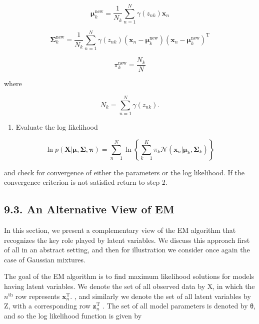 \documentclass[
  10
]{article}
\providecommand{\tightlist}{%
  \setlength{\itemsep}{0pt}\setlength{\parskip}{0pt}}
\begin{document}
\[
{\pmb {\mu} _ {k} ^ {\mathrm{new}}} = {\frac {1}{N _ {k}} \sum_ {n = 1} ^ {N} \gamma (z _ {n k}) \mathbf {x} _ {n}}\tag{9.24}
\]

\[
{\pmb {\Sigma} _ {k} ^ {\mathrm{new}}} = {\frac {1}{N _ {k}} \sum_ {n = 1} ^ {N} \gamma (z _ {n k}) (\mathbf {x} _ {n} - \pmb {\mu} _ {k} ^ {\mathrm{new}}) (\mathbf {x} _ {n} - \pmb {\mu} _ {k} ^ {\mathrm{new}}) ^ {\mathrm{T}}}\tag{9.25}
\]

\[
\pi_ {k} ^ {\mathrm{new}} = \frac {N _ {k}}{N}\tag{9.26}
\]

where

\[
N _ {k} = \sum_ {n = 1} ^ {N} \gamma (z _ {n k}).\tag{9.27}
\]

\begin{enumerate}
\def\labelenumi{\arabic{enumi}.}
\setcounter{enumi}{3}
\tightlist
\item
  Evaluate the log likelihood
\end{enumerate}

\[
\ln p (\mathbf {X} | \boldsymbol {\mu}, \boldsymbol {\Sigma}, \boldsymbol {\pi}) = \sum_ {n = 1} ^ {N} \ln \left\{\sum_ {k = 1} ^ {K} \pi_ {k} \mathcal {N} (\mathbf {x} _ {n} | \boldsymbol {\mu} _ {k}, \boldsymbol {\Sigma} _ {k}) \right\}\tag{9.28}
\]

and check for convergence of either the parameters or the log
likelihood. If the convergence criterion is not satisfied return to step
2.

\subsection{9.3. An Alternative View of
EM}\label{an-alternative-view-of-em}

In this section, we present a complementary view of the EM algorithm
that recognizes the key role played by latent variables. We discuss this
approach first of all in an abstract setting, and then for illustration
we consider once again the case of Gaussian mixtures.

The goal of the EM algorithm is to find maximum likelihood solutions for
models having latent variables. We denote the set of all observed data
by X, in which the \(n ^ { \mathrm { t h } }\) row represents
\(\mathbf { x } _ { n } ^ { \mathrm { { T } } } .\) , and similarly we
denote the set of all latent variables by Z, with a corresponding row
\({ \mathbf z } _ { n } ^ { \mathrm { T } }\) . The set of all model
parameters is denoted by θ, and so the log likelihood function is given
by
\end{document}

